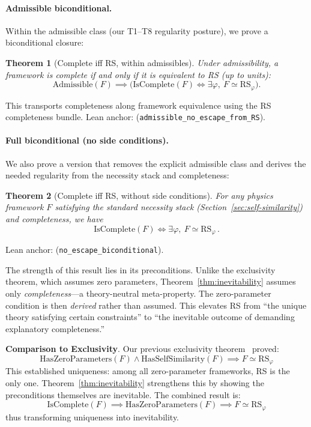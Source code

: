 \documentclass[12pt]{article}
\newtheorem{theorem}{Theorem}[section]
\theoremstyle{remark}
\begin{document}
\paragraph{Admissible biconditional.} Within the admissible class (our T1--T8 regularity posture), we prove a biconditional closure:
\begin{theorem}[Complete iff RS, within admissibles]\label{thm:admissible-biconditional}
Under admissibility, a framework is complete if and only if it is equivalent to RS (up to units):
\[
\mathrm{Admissible}(F) \implies \big(\mathrm{IsComplete}(F) \iff \exists \varphi,\ F \simeq \mathrm{RS}_\varphi\big).
\]
\end{theorem}
This transports completeness along framework equivalence using the RS completeness bundle. Lean anchor:  (\texttt{admissible\_no\_escape\_from\_RS}).

\paragraph{Full biconditional (no side conditions).} We also prove a version that removes the explicit admissible class and derives the needed regularity from the necessity stack and completeness:
\begin{theorem}[Complete iff RS, without side conditions]\label{thm:no-side-biconditional}
For any physics framework $F$ satisfying the standard necessity stack (Section~\ref{sec:self-similarity}) and completeness, we have
\[
\mathrm{IsComplete}(F) \iff \exists \varphi,\ F \simeq \mathrm{RS}_\varphi\,.
\]
\end{theorem}
Lean anchor:  (\texttt{no\_escape\_biconditional}).

The strength of this result lies in its preconditions. Unlike the exclusivity theorem, which assumes zero parameters, Theorem~\ref{thm:inevitability} assumes only \emph{completeness}---a theory-neutral meta-property. The zero-parameter condition is then \emph{derived} rather than assumed. This elevates RS from ``the unique theory satisfying certain constraints'' to ``the inevitable outcome of demanding explanatory completeness.''

\textbf{Comparison to Exclusivity}. Our previous exclusivity theorem~\cite{Washburn2025Exclusivity} proved:
\[
\mathrm{HasZeroParameters}(F) \land \mathrm{HasSelfSimilarity}(F) \implies F \simeq \mathrm{RS}_\varphi
\]
This established uniqueness: among all zero-parameter frameworks, RS is the only one. Theorem~\ref{thm:inevitability} strengthens this by showing the preconditions themselves are inevitable. The combined result is:
\[
\mathrm{IsComplete}(F) \implies \mathrm{HasZeroParameters}(F) \implies F \simeq \mathrm{RS}_\varphi
\]
thus transforming uniqueness into inevitability.
\end{document}
